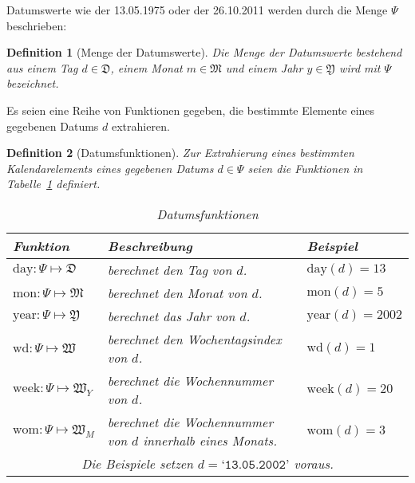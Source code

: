 \documentclass[a4paper]{article}
\newcommand*{\dayf}{\mathrm{day}}
\newcommand*{\monf}{\mathrm{mon}}
\newcommand*{\yearf}{\mathrm{year}}
\newcommand*{\wdf}{\mathrm{wd}}
\newcommand*{\weekf}{\mathrm{week}}
\newcommand*{\womf}{\mathrm{wom}}
\newcommand*{\datev}[1]{\texttt{`#1'}}
\newcommand*{\mondays}{\mathfrak{D}}
\newcommand*{\months}{\mathfrak{M}}
\newcommand*{\wkdays}{\mathfrak{W}}
\newcommand*{\years}{\mathfrak{Y}}
\newcommand*{\weeksyr}{\mathfrak{W}_Y}
\newcommand*{\weeksmo}{\mathfrak{W}_M}
\numberwithin{equation}{section}
\newtheorem{dfn}{Definition}
\begin{document}
\noindent Datumswerte wie der 13.05.1975 oder der 26.10.2011 werden durch die
Menge $\Psi$ beschrieben:
\begin{dfn}[Menge der Datumswerte]
  Die Menge der Datumswerte bestehend aus einem Tag $d \in \mondays$, einem
  Monat $m \in \months$ und einem Jahr $y \in \years$ wird mit $\Psi$
  bezeichnet.
\end{dfn}

Es seien eine Reihe von Funktionen gegeben, die bestimmte Elemente eines
gegebenen Datums $d$ extrahieren.
\begin{dfn}[Datumsfunktionen]
  Zur Extrahierung eines bestimmten Kalendarelements eines gegebenen Datums
  $d \in \Psi$ seien die Funktionen in Tabelle~\ref{tab:dateFunctions}
  definiert.
  \begin{table}[tp]
  \caption{Datumsfunktionen}\label{tab:dateFunctions}
  \begin{tabularx}{\textwidth}{lXl}
  \hline
  Funktion & Beschreibung & Beispiel \\
  \hline
  $\dayf : \Psi \mapsto \mondays$ & berechnet den Tag von $d$. &
    $\dayf(d) = 13$ \\
  $\monf : \Psi \mapsto \months$ & berechnet den Monat von $d$. &
    $\monf(d) = 5$ \\
  $\yearf : \Psi \mapsto \years$ & berechnet das Jahr von $d$. &
    $\yearf(d) = 2002$ \\
  $\wdf : \Psi \mapsto \wkdays$ & berechnet den Wochentagsindex von $d$. &
    $\wdf(d) = 1$ \\
  $\weekf : \Psi \mapsto \weeksyr$ & berechnet die Wochennummer von $d$. &
    $\weekf(d) = 20$ \\
  $\womf : \Psi \mapsto \weeksmo$ & berechnet die Wochennummer von $d$
    innerhalb eines Monats. & $\womf(d) = 3$ \\
  \hline
  \multicolumn{3}{c}{Die Beispiele setzen $d = \datev{13.05.2002}$ voraus.}
  \end{tabularx}\end{table}
\end{dfn}
\end{document}
